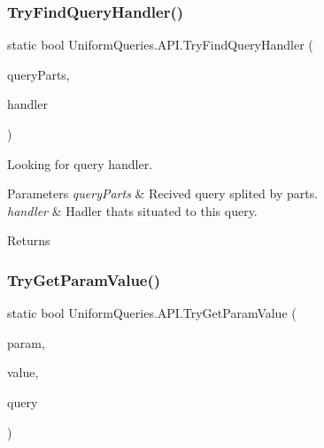 \subsubsection{\texorpdfstring{Try\+Find\+Query\+Handler()}{TryFindQueryHandler()}\hspace{0.1cm}{\footnotesize\ttfamily [2/2]}}
{\footnotesize\ttfamily static bool Uniform\+Queries.\+A\+P\+I.\+Try\+Find\+Query\+Handler (\begin{DoxyParamCaption}\item[{\mbox{\hyperlink{struct_uniform_queries_1_1_query_part}{Query\+Part}} \mbox{[}$\,$\mbox{]}}]{query\+Parts,  }\item[{out \mbox{\hyperlink{interface_uniform_queries_1_1_executable_1_1_i_query_handler}{I\+Query\+Handler}}}]{handler }\end{DoxyParamCaption})\hspace{0.3cm}{\ttfamily [static]}}



Looking for query handler. 


\begin{DoxyParams}{Parameters}
{\em query\+Parts} & Recived query splited by parts.\\
\hline
{\em handler} & Hadler that\textquotesingle{}s situated to this query.\\
\hline
\end{DoxyParams}
\begin{DoxyReturn}{Returns}

\end{DoxyReturn}
\mbox{\label{class_uniform_queries_1_1_a_p_i_a987eb23a48b90e542001cc12fcbc1ddc}} 
\subsubsection{\texorpdfstring{Try\+Get\+Param\+Value()}{TryGetParamValue()}\hspace{0.1cm}{\footnotesize\ttfamily [1/3]}}
{\footnotesize\ttfamily static bool Uniform\+Queries.\+A\+P\+I.\+Try\+Get\+Param\+Value (\begin{DoxyParamCaption}\item[{string}]{param,  }\item[{out string}]{value,  }\item[{string}]{query }\end{DoxyParamCaption})\hspace{0.3cm}{\ttfamily [static]}}



